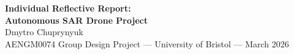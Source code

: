 \documentclass[11pt,a4paper]{article}
\begin{document}
\begin{center}
  {\LARGE\bfseries Individual Reflective Report:\\[3pt]
   Autonomous SAR Drone Project}\\[12pt]
  {\large Dmytro Chuprynyuk}\\[4pt]
  {\normalsize AENGM0074 Group Design Project --- University of Bristol --- March 2026}
\end{center}

\vspace{8pt}







\newpage
\printbibliography[heading=bibintoc,title={References}]
\end{document}
